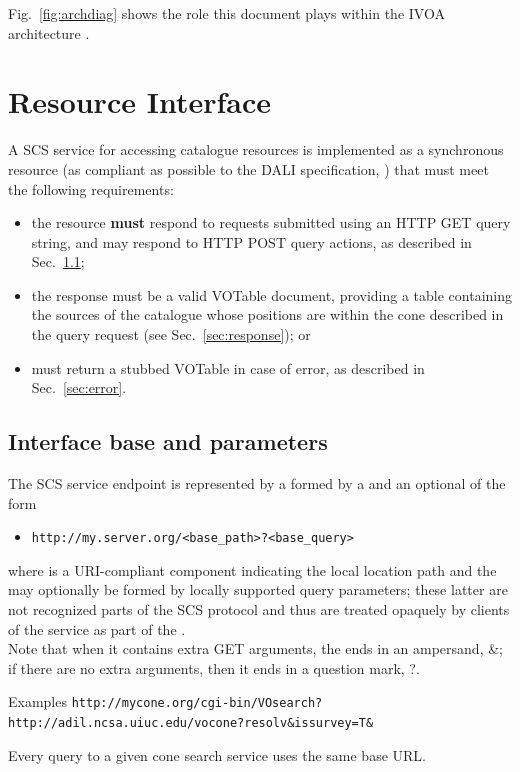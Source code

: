 \documentclass[11pt,a4paper]{ivoa}
\begin{document}
Fig.~\ref{fig:archdiag} shows the role this document plays within the
IVOA architecture \citep{note:VOARCH}.

\section{Resource Interface}
\label{sec:resif}

A SCS service for accessing catalogue resources is implemented as a synchronous resource (as compliant as possible to the DALI specification, \citet{std:DALI}) that must meet the following requirements:
\begin{itemize}
	\item the resource \textbf{must} respond to requests submitted using an HTTP GET query string, and may respond to HTTP POST query actions, as described in Sec.~\ref{sec:basepar};
	\item the response must be a valid VOTable document, providing a table containing the sources of the catalogue whose positions are within the cone described in the query request (see Sec.~\ref{sec:response}); or
	\item must return a stubbed VOTable in case of error, as described in Sec.~\ref{sec:error}.
\end{itemize}

\subsection{Interface base and parameters}
\label{sec:basepar}
The SCS service endpoint is represented by a  formed by a  and an optional  of the form
\begin{itemize}
	\item \texttt{http://my.server.org/<base\_path>?<base\_query>}
\end{itemize}
where  is a URI-compliant component indicating the local location path and the  may optionally be formed by locally supported query parameters; these latter are not recognized parts of the SCS protocol and thus are treated opaquely by clients of the service as part of the .\\
Note that when it contains extra GET arguments, the  ends in an ampersand, \&; if there are no extra arguments, then it ends in a question mark, ?.\\
		\begin{bigdescription}
		\item[Examples] \texttt{http://mycone.org/cgi-bin/VOsearch?}\\
		\texttt{http://adil.ncsa.uiuc.edu/vocone?resolv\&issurvey=T\&}
		\end{bigdescription}
Every query to a given cone search service uses the same base URL.
\end{document}
